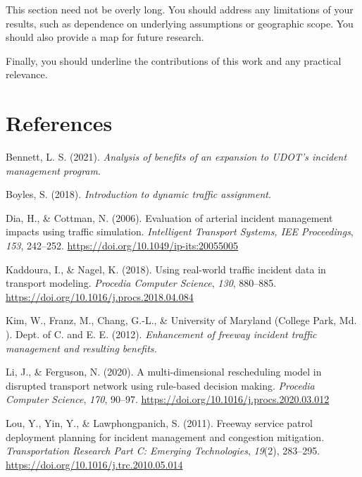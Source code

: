 \documentclass[fancy, oneside, mastersfancy, ms]{byuthesis}
\newlength{\cslhangindent}
\newlength{\cslentryspacingunit} %
\newenvironment{CSLReferences}[2] %
 {%
  \setlength{\parindent}{0pt}
  \ifodd #1
  \let\oldpar\par
  \def\par{\hangindent=\cslhangindent\oldpar}
  \fi
  \setlength{\parskip}{#2\cslentryspacingunit}
 }%
 {}
\begin{document}
This section need not be overly long. You should address any limitations
of your results, such as dependence on underlying assumptions or
geographic scope. You should also provide a map for future research.

Finally, you should underline the contributions of this work and any
practical relevance.


\hypertarget{references}{%
\chapter*{References}\label{references}}


\hypertarget{refs}{}
\begin{CSLReferences}{1}{0}
\leavevmode{}%
Bennett, L. S. (2021). \emph{Analysis of benefits of an expansion to
UDOT's incident management program}.

\leavevmode{}%
Boyles, S. (2018). \emph{Introduction to dynamic traffic assignment}.

\leavevmode{}%
Dia, H., \& Cottman, N. (2006). Evaluation of arterial incident
management impacts using traffic simulation. \emph{Intelligent Transport
Systems, IEE Proceedings}, \emph{153}, 242--252.
\url{https://doi.org/10.1049/ip-its:20055005}

\leavevmode{}%
Kaddoura, I., \& Nagel, K. (2018). Using real-world traffic incident
data in transport modeling. \emph{Procedia Computer Science},
\emph{130}, 880--885. \url{https://doi.org/10.1016/j.procs.2018.04.084}

\leavevmode{}%
Kim, W., Franz, M., Chang, G.-L., \& University of Maryland (College
Park, Md. ). Dept. of C. and E. E. (2012). \emph{Enhancement of freeway
incident traffic management and resulting benefits.}

\leavevmode{}%
Li, J., \& Ferguson, N. (2020). A multi-dimensional rescheduling model
in disrupted transport network using rule-based decision making.
\emph{Procedia Computer Science}, \emph{170}, 90--97.
\url{https://doi.org/10.1016/j.procs.2020.03.012}

\leavevmode{}%
Lou, Y., Yin, Y., \& Lawphongpanich, S. (2011). Freeway service patrol
deployment planning for incident management and congestion mitigation.
\emph{Transportation Research Part C: Emerging Technologies},
\emph{19}(2), 283--295. \url{https://doi.org/10.1016/j.trc.2010.05.014}


\end{CSLReferences}
\end{document}
